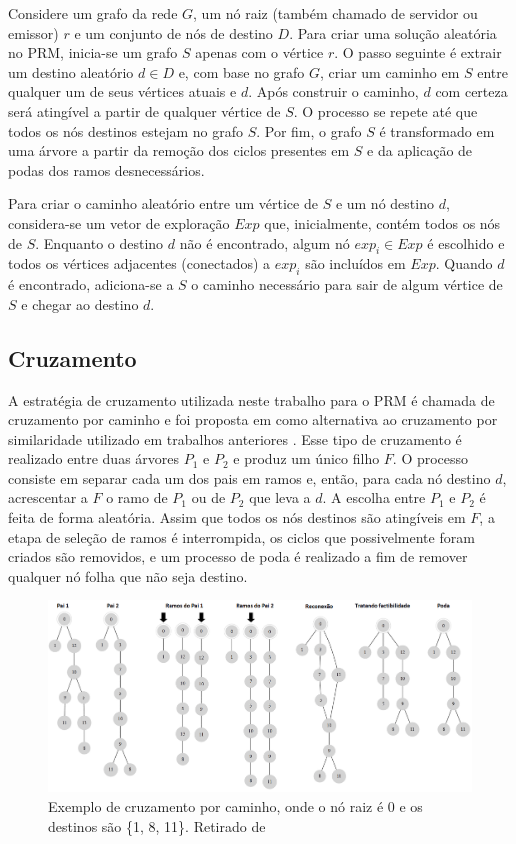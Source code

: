 Considere um grafo da rede $G$, um nó raiz (também chamado de servidor ou emissor) $r$ e um conjunto de nós de destino $D$. Para criar uma solução aleatória no PRM, inicia-se um grafo $S$ apenas com o vértice $r$. O passo seguinte é extrair um destino aleatório $d \in D$ e, com base no grafo $G$, criar um caminho em $S$ entre qualquer um de seus vértices atuais e $d$. Após construir o caminho, $d$ com certeza será atingível a partir de qualquer vértice de $S$. O processo se repete até que todos os nós destinos estejam no grafo $S$. Por fim, o grafo $S$ é transformado em uma árvore a partir da remoção dos ciclos presentes em $S$ e da aplicação de podas dos ramos desnecessários.

Para criar o caminho aleatório entre um vértice de $S$ e um nó destino $d$, considera-se um vetor de exploração $Exp$ que, inicialmente, contém todos os nós de $S$. Enquanto o destino $d$ não é encontrado, algum nó $exp_i \in Exp$ é escolhido e todos os vértices adjacentes (conectados) a $exp_i$ são incluídos em $Exp$. Quando $d$ é encontrado, adiciona-se a $S$ o caminho necessário para sair de algum vértice de $S$ e chegar ao destino $d$.

\subsection{Cruzamento}

A estratégia de cruzamento utilizada neste trabalho para o PRM é chamada de cruzamento por caminho e foi proposta em \cite{Lafeta2016} como alternativa ao cruzamento por similaridade utilizado em trabalhos anteriores \cite{Bueno2010}. Esse tipo de cruzamento é realizado entre duas árvores $P_1$ e $P_2$ e produz um único filho $F$. O processo consiste em separar cada um dos pais em ramos e, então, para cada nó destino $d$, acrescentar a $F$ o ramo de $P_1$ ou de $P_2$ que leva a $d$. A escolha entre $P_1$ e $P_2$ é feita de forma aleatória. Assim que todos os nós destinos são atingíveis em $F$, a etapa de seleção de ramos é interrompida, os ciclos que possivelmente foram criados são removidos, e um processo de poda é realizado a fim de remover qualquer nó folha que não seja destino.

\begin{figure}[!htbp]
	\centering
	\includegraphics[width=1\textwidth]{cap_problemas/figs/prm-cruzamento-caminho}
	\caption{\label{fig_prm-cruzamento-caminho}Exemplo de cruzamento por caminho, onde o nó raiz é 0 e os destinos são \{1, 8, 11\}. Retirado de \cite{LafetaThesis}}
\end{figure}

